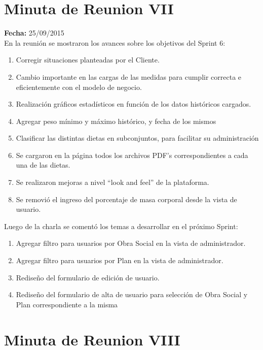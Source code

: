 \documentclass[runningheads,a4paper,spanish]{llncs}
\begin{document}
\section{Minuta de Reunion VII}

\textbf{Fecha: }25/09/2015\\

En la reunión se mostraron los avances sobre los objetivos del Sprint 6:
\begin{enumerate}
\item Corregir situaciones planteadas por el Cliente.
\item Cambio importante en las cargas de las medidas para cumplir correcta e eficientemente con el modelo de negocio.
\item Realización gráficos estadísticos en función de los datos históricos cargados.
\item Agregar peso mínimo y máximo histórico, y fecha de los mismos
\item Clasificar las distintas dietas en subconjuntos, para facilitar su administración
\item Se cargaron en la página todos los archivos PDF’s correspondientes a cada una de las dietas.
\item Se realizaron mejoras a nivel “look and feel” de la plataforma.
\item Se removió el ingreso del porcentaje de masa corporal desde la vista de usuario.
\end{enumerate}

\begin{flushleft}
Luego de la charla se comentó los temas a desarrollar en el próximo Sprint:
\end{flushleft}

\begin{enumerate}
	\item Agregar filtro para usuarios por Obra Social en la vista de administrador. 
	\item Agregar filtro para usuarios por Plan en la vista de administrador.
	\item Rediseño del formulario de edición de usuario.
	\item Rediseño del formulario de alta de usuario para selección de Obra Social y Plan correspondiente a la misma
\end{enumerate}

\section{Minuta de Reunion VIII}
\end{document}
